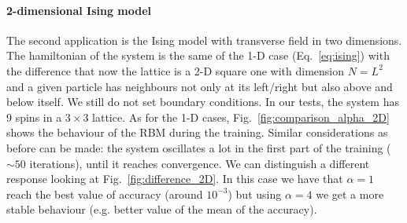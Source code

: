 \documentclass[a4paper,11pt]{article}
\begin{document}
\paragraph{2-dimensional Ising model}

The second application is the Ising model with transverse field in two dimensions. The hamiltonian of the system is the same of the 1-D case (Eq.~\ref{eq:ising}) with the difference that now the lattice is a 2-D square one with dimension $N = L^2$ and a given particle has neighbours not only at its left/right but also above and below itself. We still do not set boundary conditions. In our tests, the system has 9 spins in a $3 \times 3$ lattice. As for the 1-D cases, Fig.~\ref{fig:comparison_alpha_2D} shows the behaviour of the RBM during the training. Similar considerations as before can be made: the system oscillates a lot in the first part of the training ($\sim 50$ iterations), until it reaches convergence. We can distinguish a different response looking at Fig.~\ref{fig:difference_2D}. In this case we have that $\alpha =1$ reach the best value of accuracy (around $10^{-3}$) but using $\alpha = 4$ we get a more stable behaviour (e.g. better value of the mean of the accuracy).
\end{document}
